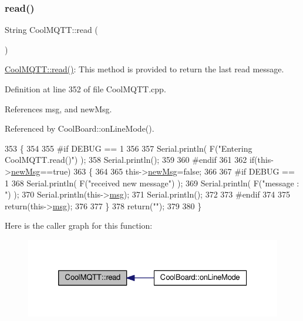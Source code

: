 \subsubsection{\texorpdfstring{read()}{read()}}
{\footnotesize\ttfamily String Cool\+M\+Q\+T\+T\+::read (\begin{DoxyParamCaption}{ }\end{DoxyParamCaption})}

\hyperlink{classCoolMQTT_ae3c18f6ae9723746d32765f1c8f176ca}{Cool\+M\+Q\+T\+T\+::read()}\+: This method is provided to return the last read message. 

Definition at line 352 of file Cool\+M\+Q\+T\+T.\+cpp.



References msg, and new\+Msg.



Referenced by Cool\+Board\+::on\+Line\+Mode().


\begin{DoxyCode}
353 \{   
354 
355 \textcolor{preprocessor}{#if DEBUG == 1 }
356 
357     Serial.println( F(\textcolor{stringliteral}{"Entering CoolMQTT.read()"}) );
358     Serial.println();
359 
360 \textcolor{preprocessor}{#endif }
361 
362     \textcolor{keywordflow}{if}(this->\hyperlink{classCoolMQTT_a3240388137b885775aadf38e96b24c6b}{newMsg}==\textcolor{keyword}{true})
363     \{
364         
365         this->\hyperlink{classCoolMQTT_a3240388137b885775aadf38e96b24c6b}{newMsg}=\textcolor{keyword}{false};
366 
367 \textcolor{preprocessor}{#if DEBUG == 1 }
368         Serial.println( F(\textcolor{stringliteral}{"received new message"}) );
369         Serial.println( F(\textcolor{stringliteral}{"message : "}) );
370         Serial.println(this->\hyperlink{classCoolMQTT_af6b19e7074dbbb4ae493c44dcb53f7ff}{msg});
371         Serial.println();
372 
373 \textcolor{preprocessor}{#endif}
374 
375         \textcolor{keywordflow}{return}(this->\hyperlink{classCoolMQTT_af6b19e7074dbbb4ae493c44dcb53f7ff}{msg});
376         
377     \}
378     \textcolor{keywordflow}{return}(\textcolor{stringliteral}{""});
379 
380 \}
\end{DoxyCode}
Here is the caller graph for this function\+:
\nopagebreak
\begin{figure}[H]
\begin{center}
\leavevmode
\includegraphics[width=326pt]{classCoolMQTT_ae3c18f6ae9723746d32765f1c8f176ca_icgraph}
\end{center}
\end{figure}
\mbox{\label{classCoolMQTT_a5d003307eff78efbd585e42b43b72b6d}} 
